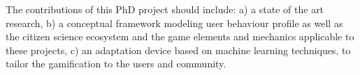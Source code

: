\documentclass[sigconf]{acmart}
\begin{document}
The contributions of this PhD project should include: a) a state of the art research, b) a conceptual framework modeling user behaviour profile as well as the citizen science ecosystem and the game elements and mechanics applicable to these projects, c) an adaptation device based on machine learning techniques, to tailor the gamification to the users and community. 





\end{document}
